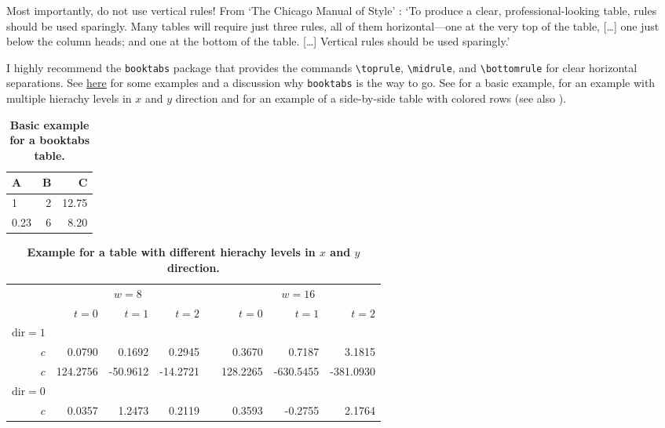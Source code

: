 Most importantly, do not use vertical rules!
From `The Chicago Manual of Style' \cite{chicagoMOS}: `To produce a clear, professional-looking table, rules should be used sparingly. Many tables will require just three rules, all of them horizontal---one at the very top of the table, [\ldots] one just below the column heads; and one at the bottom of the table. [\ldots] Vertical rules should be used sparingly.'

I highly recommend the \verb|booktabs| package that provides the commands \verb|\toprule|, \verb|\midrule|, and \verb|\bottomrule| for clear horizontal separations. See \href{https://nhigham.com/2019/11/19/better-latex-tables-with-booktabs/}{here} for some examples and a discussion why \verb|booktabs| is the way to go. See  for a basic example,  for an example with multiple hierachy levels in $x$ and $y$ direction and  for an example of a side-by-side table with colored rows (see also ).

\begin{table}
\centering 
\caption{\textbf{Basic example for a booktabs table.}}
\label{tab:table1}
\vspace{5ex}
	\begin{tabular}{lrr} 
		\toprule
		A & B & C \\ 
		\midrule 
		1 & 2 & 12.75 \\
		0.23 & 6 & 8.20 \\
		\bottomrule
	\end{tabular}
\end{table}

\begin{table}
	\centering
	\caption{\textbf{Example for a table with different hierachy levels in $x$ and $y$ direction.}}
	\label{tab:table2}
	\vspace{5ex}
	\begin{tabular}{@{}rrrrcrrr@{}}\toprule
		& \multicolumn{3}{c}{$w = 8$} & \phantom{abc}& \multicolumn{3}{c}{$w = 16$} \\
		\cmidrule{2-4} \cmidrule{6-8}
		& $t=0$ & $t=1$ & $t=2$ && $t=0$ & $t=1$ & $t=2$\\ 
		\midrule
		$\mathrm{dir}=1$\\
		$c$ & 0.0790 & 0.1692 & 0.2945 && 0.3670 & 0.7187 & 3.1815 \\
		$c$ & 124.2756& -50.9612& -14.2721&& 128.2265& -630.5455& -381.0930\\
		$\mathrm{dir}=0$\\
		$c$ & 0.0357& 1.2473& 0.2119&& 0.3593& -0.2755& 2.1764\\
		\bottomrule
	\end{tabular}

\end{table}

